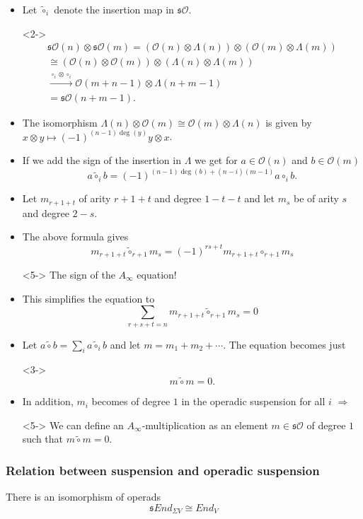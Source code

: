 \documentclass{beamer}
\theoremstyle{definition}
\begin{document}
\begin{frame}
\begin{itemize}
\item<1-> Let $\tilde{\circ}_i$ denote the insertion map in $\mathfrak{s}\mathcal{O}$.
\item[]<2-> \begin{align*}
\mathfrak{s}\mathcal{O}(n)\otimes\mathfrak{s}\mathcal{O}(m)=(\mathcal{O}(n)\otimes\Lambda(n))\otimes (\mathcal{O}(m)\otimes\Lambda(m))\\
\cong (\mathcal{O}(n)\otimes \mathcal{O}(m))\otimes (\Lambda(n)\otimes \Lambda(m))\\
\xrightarrow{\circ_i\otimes\circ_i} \mathcal{O}(m+n-1)\otimes \Lambda(n+m-1)\\=\mathfrak{s}\mathcal{O}(n+m-1).
\end{align*}
\end{itemize}
\end{frame}
\begin{frame}
\begin{itemize}
\item<1-> The isomorphism $\Lambda(n)\otimes \mathcal{O}(m)\cong \mathcal{O}(m)\otimes \Lambda(n)$ is given by $x\otimes y\mapsto (-1)^{(n-1)\deg(y)}y\otimes x$.
\item<2-> If we add the sign of the insertion in $\Lambda$ we get for $a\in\mathcal{O}(n)$ and $b\in\mathcal{O}(m)$
\[a\tilde{\circ}_ib=(-1)^{(n-1)\deg(b)+(n-i)(m-1)}a\circ_i b.\]
\item<3-> Let $m_{r+1+t}$ of arity $r+1+t$ and degree $1-t-t$ and let $m_s$ be of arity $s$ and degree $2-s$. %
\item<4-> The above formula gives 
\[m_{r+1+t}\tilde{\circ}_{r+1}m_s=(-1)^{rs+t}m_{r+1+t}\circ_{r+1}m_s\]
\item[]<5-> The sign of the $A_\infty$ equation!
\end{itemize}
\end{frame}

\begin{frame}
\begin{itemize}
\item<1-> This simplifies the equation to
\[\sum_{r+s+t=n}m_{r+1+t}\tilde{\circ}_{r+1}m_s=0\] %
\item<2-> Let $a\tilde{\circ}b=\sum_{i}a\tilde{\circ}_ib$ and let $m=m_1+m_2+\cdots$. The equation becomes just
\item[]<3-> \[m\tilde{\circ}m=0.\] %
\item<4-> In addition, $m_i$ becomes of degree $1$ in the operadic suspension for all $i$ $\Rightarrow$
\item[]<5-> We can define an $A_\infty$-multiplication as an element $m\in\mathfrak{s}\mathcal{O}$ of degree $1$ such that $m\tilde{\circ}m=0$. 
\end{itemize}
\end{frame}
\begin{frame}
\frametitle{Relation between suspension and operadic suspension}
\begin{theorem}[Markl]
There is an isomorphism of operads
\[ \mathfrak{s}End_{\Sigma V}\cong End_V\]
\end{theorem}
\end{frame}
\end{document}
